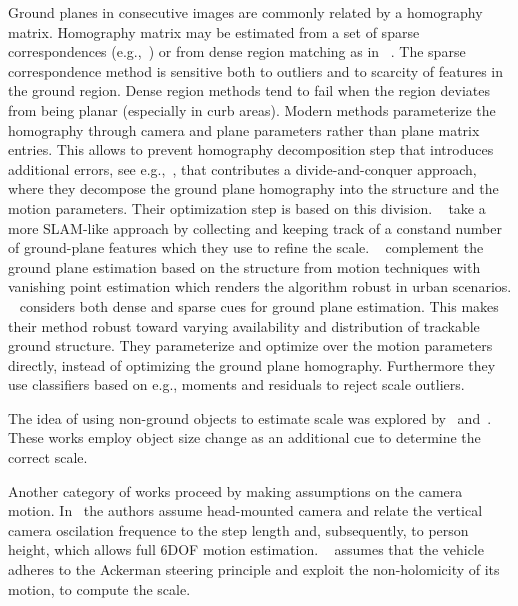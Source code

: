 Ground planes in consecutive images are commonly related by a
homography matrix. Homography matrix may be estimated from a set of
sparse correspondences (e.g.,~\cite{song2014robust}) or from dense
region matching as in ~\cite{7995955}.  The sparse correspondence
method is sensitive both to outliers and to scarcity of features in
the ground region.  Dense region methods tend to fail when the region
deviates from being planar (especially in curb areas). Modern methods
parameterize the homography through camera and plane parameters rather
than plane matrix entries.  This allows to prevent homography
decomposition step that introduces additional errors, see
e.g.,~\cite{zhou2016reliable}, that contributes a divide-and-conquer
approach, where they decompose the ground plane homography into the
structure and the motion parameters.  Their optimization step is based
on this division.  ~\cite{kitt2011monocular} take a more SLAM-like
approach by collecting and keeping track of a constand number of
ground-plane features which they use to refine the scale.
~\cite{grater2015robust} complement the ground plane estimation based
on the structure from motion techniques with vanishing point
estimation which renders the algorithm robust in urban
scenarios. ~\cite{7995955} considers both dense and sparse cues for
ground plane estimation.  This makes their method robust toward
varying availability and distribution of trackable ground structure.
They parameterize and optimize over the motion parameters directly,
instead of optimizing the ground plane homography.  Furthermore they
use classifiers based on e.g., moments and residuals to reject scale
outliers.

The idea of using non-ground objects to estimate scale was explored
by~\cite{song2014robust} and~\cite{frost2016}.  These works employ
object size change as an additional cue to determine the correct scale.

Another category of works proceed by making assumptions on the camera
motion. In~\cite{gutierrez2012full} the authors assume head-mounted
camera and relate the vertical camera oscilation frequence to the step
length and, subsequently, to person height, which allows full 6DOF
motion estimation. ~\cite{scaramuzza2009absolute} assumes that the
vehicle adheres to the Ackerman steering principle and exploit the
non-holomicity of its motion, to compute the scale.

